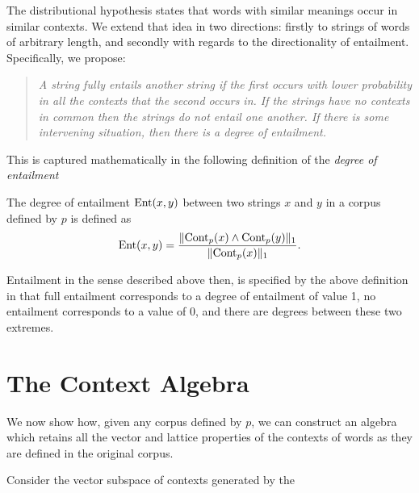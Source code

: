 \documentclass[12pt]{report}
\newcommand{\Cont}{\mathrm{Cont}}
\begin{document}
The distributional hypothesis states that words with similar meanings occur in similar contexts. We extend that idea in two directions: firstly to strings of words of arbitrary length, and secondly with regards to the directionality of entailment. Specifically, we propose:
\begin{quote}
\emph{A string fully entails another string if the first occurs with lower probability in all the contexts that the second occurs in. If the strings have no contexts in common then the strings do not entail one another. If there is some intervening situation, then there is a \emph{degree} of entailment.}
\end{quote}
This is captured mathematically in the following definition of the \emph{degree of entailment}
\begin{defn}
The degree of entailment $\operatorname{Ent}(x,y)$ between two strings $x$ and $y$ in a corpus defined by $p$ is defined as
$$\Ent(x,y) = \frac{\|\Cont_p(x)\land\Cont_p(y)\|_1}{\|\Cont_p(x)\|_1}.$$
\end{defn}
Entailment in the sense described above then, is specified by the above definition in that full entailment corresponds to a degree of entailment of value 1, no entailment corresponds to a value of 0, and there are degrees between these two extremes.

\section{The Context Algebra}

We now show how, given any corpus defined by $p$, we can construct an algebra which retains all the vector and lattice properties of the contexts of words as they are defined in the original corpus.

Consider the vector subspace of contexts generated by the 
\end{document}
